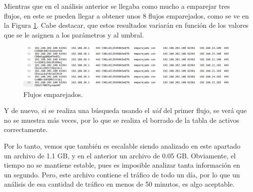 \intro Mientras que en el análisis anterior se llegaba como mucho a emparejar tres flujos, en este se pueden llegar a obtener unos 8 
flujos emparejados, como se ve en la Figura \ref{fig.flujosemparejados}. Cabe destacar, que estos resultados variarán en función de los valores que se le asignen a los parámetros y al umbral.

\begin{figure}[H]
  \includegraphics[width=1\textwidth]{imagenes/flujosemparejados.png}
  \centering
  \caption{Flujos emparejados.}\label{fig.flujosemparejados}
\end{figure}

\intro Y de nuevo, si se realiza una búsqueda usando el \textit{uid} del primer flujo, se verá que no se muestra más veces, por lo que 
se realiza el borrado de la tabla de activos correctamente.

\intro Por lo tanto, vemos que también es escalable siendo analizado en este apartado un archivo de 1.1 GB, y en el anterior un 
archivo de 0.05 GB. Obviamente, el tiempo no se mantiene estable, pues es imposible analizar tanta información en un segundo. Pero, este archivo contiene el tráfico de todo un día, por lo que un análisis de esa cantidad de tráfico en menos de 50 minutos, es algo 
aceptable.
